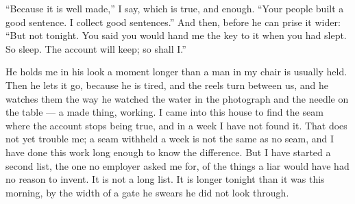 ``Because it is well made,'' I say, which is true, and enough. ``Your people built a good sentence. I collect good sentences.'' And then, before he can prise it wider: ``But not tonight. You said you would hand me the key to it when you had slept. So sleep. The account will keep; so shall I.''\par

He holds me in his look a moment longer than a man in my chair is usually held. Then he lets it go, because he is tired, and the reels turn between us, and he watches them the way he watched the water in the photograph and the needle on the table --- a made thing, working. I came into this house to find the seam where the account stops being true, and in a week I have not found it. That does not yet trouble me; a seam withheld a week is not the same as no seam, and I have done this work long enough to know the difference. But I have started a second list, the one no employer asked me for, of the things a liar would have had no reason to invent. It is not a long list. It is longer tonight than it was this morning, by the width of a gate he swears he did not look through.\par

\ornament
